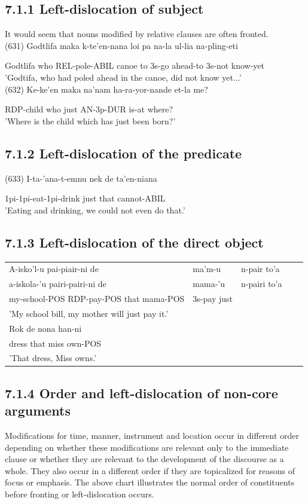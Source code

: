\documentclass[10pt]{article}
\begin{document}
\subsection*{7.1.1 Left-dislocation of subject}
It would seem that nouns modified by relative clauses are often fronted.\\
(631) Godtlifa maka k-te'en-nana loi pa na-la ul-lia na-pling-eti

Godtlifa who REL-pole-ABIL canoe to 3s-go ahead-to 3s-not know-yet\\
'Godtifa, who had poled ahead in the canoe, did not know yet...'\\
(632) Ke-ke'en maka na'nam ha-ra-yor-nande et-la me?

RDP-child who just AN-3p-DUR is-at where?\\
'Where is the child which has just been born?'

\subsection*{7.1.2 Left-dislocation of the predicate}
(633) I-ta-'ana-t-emnu nek de ta'en-niana

1pi-1pi-eat-1pi-drink just that cannot-ABIL\\
'Eating and drinking, we could not even do that.'

\subsection*{7.1.3 Left-dislocation of the direct object}
\begin{center}
\begin{tabular}{lllll}
A-isko'l-u pai-piair-ni de & ma'm-u & n-pair to'a \\
a-iskola-'u pairi-pairi-ni de & mama-'u & n-pairi to'a \\
my-school-POS RDP-pay-POS that mama-POS & 3s-pay just &  \\
'My school bill, my mother will just pay it.' &  &  \\
Rok de nona han-ni &  &  \\
dress that miss own-POS &  &  \\
'That dress, Miss owns.' &  &  \\
\end{tabular}
\end{center}

\subsection*{7.1.4 Order and left-dislocation of non-core arguments}
Modifications for time, manner, instrument and location occur in different order depending on whether these modifications are relevant only to the immediate clause or whether they are relevant to the development of the discourse as a whole. They also occur in a different order if they are topicalized for reasons of focus or emphasis. The above chart illustrates the normal order of constituents before fronting or left-dislocation occurs.
\end{document}
